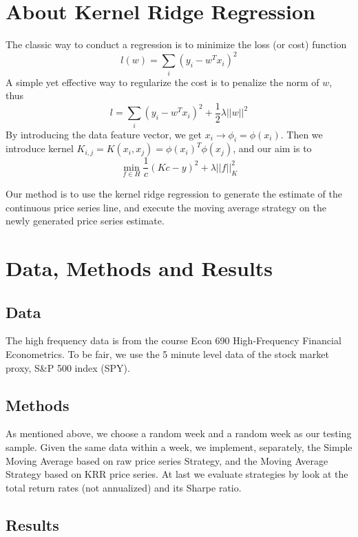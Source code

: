 \documentclass{article} %
\begin{document}
\section{About Kernel Ridge Regression}
The classic way to conduct a regression is to minimize the loss (or cost) function 
\[
l(w) = \sum_i (y_i - w^{T}x_i)^{2}
\]
A simple yet effective way to regularize the cost is to penalize the norm of $w$, thus
\[
l = \sum_i (y_i - w^{T}x_i)^{2}+\frac{1}{2}\lambda||w||^2
\]
By introducing the data feature vector, we get $x_i \to \phi_i = \phi(x_i)$. Then we introduce kernel $K_{i, j} = K(x_i, x_j) = \phi(x_i)^T\phi(x_j)$, and our aim is to 
\[
\min_{f\in H} \frac{1}{c}(Kc-y)^2+\lambda||f||^2_K
\]


Our method is to use the kernel ridge regression to generate the estimate of the continuous price series line, and execute the moving average strategy on the newly generated price series estimate.

\section{Data, Methods and Results}

\subsection{Data}
The high frequency data is from the course Econ 690 High-Frequency Financial Econometrics. To be fair, we use the 5 minute level data of the stock market proxy, S\&P 500 index (SPY).

\subsection{Methods}
As mentioned above, we choose a random week and a random week as our testing sample. Given the same data within a week, we implement, separately, the Simple Moving Average based on raw price series Strategy, and the Moving Average Strategy based on KRR price series. At last we evaluate strategies by look at the total return rates (not annualized) and its Sharpe ratio.

\subsection{Results}
\end{document}
